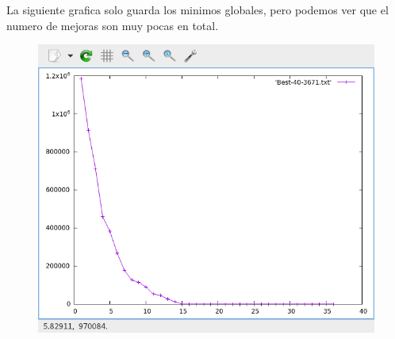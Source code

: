 \documentclass{article}
\begin{document}
    La siguiente grafica solo guarda los minimos globales, pero podemos ver que el numero de mejoras son muy
    pocas en total.
    \begin{figure}[h]
        \centering
        \includegraphics[scale=.42]{Best40.png}
    \end{figure}
    
\end{document}
